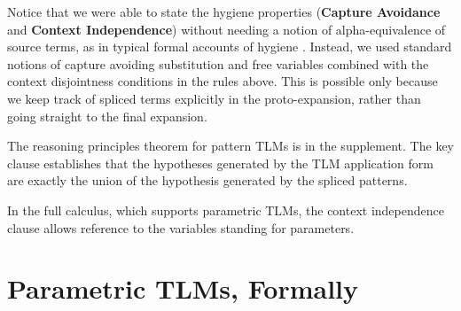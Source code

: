 \documentclass[acmsmall,review,anonymous]{acmart}\settopmatter{printfolios=true,printccs=false,printacmref=false}
\begin{document}

Notice that we were able to state the hygiene properties (\textbf{Capture Avoidance} and \textbf{Context Independence}) without needing a notion of alpha-equivalence of source terms, as in typical formal accounts of hygiene \cite{Kohlbecker86a,DBLP:conf/popl/Adams15,DBLP:conf/popl/ClingerR91,DBLP:journals/lisp/DybvigHB92,DBLP:conf/esop/HermanW08,Herman10:Theory}. Instead, we used standard notions of capture avoiding substitution and free variables combined with the context disjointness conditions in the rules above. This is possible only because we keep track of spliced terms explicitly in the proto-expansion, rather than going straight to the final expansion. %

The reasoning principles theorem for pattern TLMs is in the supplement. The key clause establishes that the hypotheses generated by the TLM application form are exactly the union of the hypothesis generated by the spliced patterns. %

In the full calculus, which supports parametric TLMs, the context independence clause allows reference to the variables standing for parameters.

\newcommand{\pTLMsFormallySec}{Parametric TLMs, Formally}
\section{\protect\pTLMsFormallySec}
\label{sec:ptlms-formally}

\end{document}

